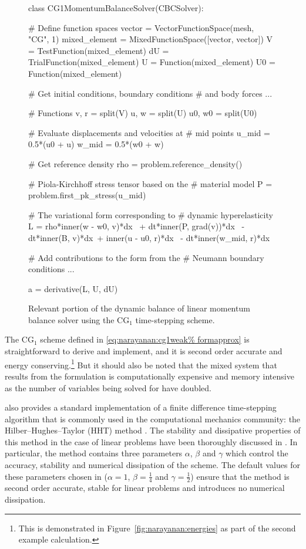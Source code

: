 \begin{figure}[ht]
\begin{python}
class CG1MomentumBalanceSolver(CBCSolver):

    # Define function spaces
    vector = VectorFunctionSpace(mesh, "CG", 1)
    mixed_element = MixedFunctionSpace([vector,
                                        vector])
    V = TestFunction(mixed_element)
    dU = TrialFunction(mixed_element)
    U = Function(mixed_element)
    U0 = Function(mixed_element)

    # Get initial conditions, boundary conditions
    # and body forces
    ...

    # Functions
    v, r = split(V)
    u, w = split(U)
    u0, w0 = split(U0)

    # Evaluate displacements and velocities at
    # mid points
    u_mid = 0.5*(u0 + u)
    w_mid = 0.5*(w0 + w)

    # Get reference density
    rho = problem.reference_density()

    # Piola-Kirchhoff stress tensor based on the
    # material model
    P = problem.first_pk_stress(u_mid)

    # The variational form corresponding to
    # dynamic hyperelasticity
    L = rho*inner(w - w0, v)*dx \
        + dt*inner(P, grad(v))*dx \
        - dt*inner(B, v)*dx\
        + inner(u - u0, r)*dx \
        - dt*inner(w_mid, r)*dx

    # Add contributions to the form from the
    # Neumann boundary conditions
    ...

    a = derivative(L, U, dU)
\end{python}
\caption{Relevant portion of the dynamic balance of linear momentum
  balance solver using the CG$_{1}$ time-stepping scheme.}
\label{code:narayanan:cg1}
\end{figure}

The CG$_{1}$ scheme defined in \eqref{eq:narayanan:cg1weak%
formapprox} is straightforward to derive and implement, and it is
second order accurate and energy conserving.\footnote{This is
  demonstrated in Figure~\ref{fig:narayanan:energies} as part of the
  second example calculation.}  But it should also be noted that the mixed
system that results from the formulation is computationally expensive
and memory intensive as the number of variables being solved for have
doubled.

\twist{} also provides a standard implementation of a finite
difference time-stepping algorithm that is commonly used in the
computational mechanics community: the Hilber--Hughes--Taylor (HHT)
method \citep{HilberHughesTaylor1977}. The stability and dissipative
properties of this method in the case of linear problems have been
thoroughly discussed in \citet{Hughes1987}. In particular, the method
contains three parameters $\alpha$, $\beta$ and $\gamma$ which control
the accuracy, stability and numerical dissipation of the scheme. The
default values for these parameters chosen in \twist{} ($\alpha = 1$,
$\beta = \frac{1}{4}$ and $\gamma = \frac{1}{2}$) ensure that the
method is second order accurate, stable for linear problems and
introduces no numerical dissipation.

